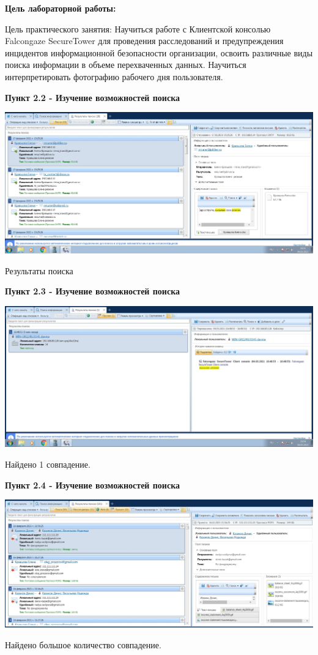 \documentclass[a4paper,14pt]{extarticle}
\begin{document}
    \textbf{Цель лабораторной работы:}

    Цель практического занятия: Научиться работе с Клиентской консолью
    Falcongaze SecureTower для проведения расследований и предупреждения инцидентов
    информационной безопасности организации, освоить различные виды поиска информации
    в объеме перехваченных данных. Научиться интерпретировать фотографию рабочего дня
    пользователя.

    \textbf{Пункт 2.2 - Изучение возможностей поиска}
    \begin{center}
        \includegraphics[scale=0.25]{pics/2.2.jpg}

        Результаты поиска
    \end{center}

    \textbf{Пункт 2.3 - Изучение возможностей поиска}
    \begin{center}
        \includegraphics[scale=0.25]{pics/2.3.jpg}
        
        Найдено 1 совпадение.
    \end{center}

    \newpage
    \textbf{Пункт 2.4 - Изучение возможностей поиска}
    \begin{center}
        \includegraphics[scale=0.25]{pics/2.4.jpg}

        Найдено большое количество совпадение.
    \end{center}
\end{document}
